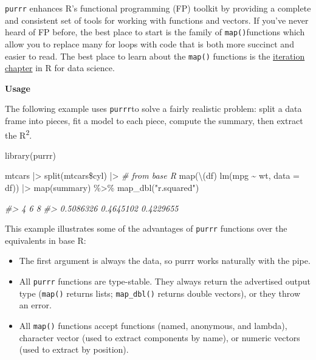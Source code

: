 \documentclass[
]{article}
\newenvironment{Shaded}{}{}
\newcommand{\AttributeTok}[1]{\textcolor[rgb]{0.49,0.56,0.16}{#1}}
\newcommand{\CommentTok}[1]{\textcolor[rgb]{0.38,0.63,0.69}{\textit{#1}}}
\newcommand{\FunctionTok}[1]{\textcolor[rgb]{0.02,0.16,0.49}{#1}}
\newcommand{\NormalTok}[1]{#1}
\newcommand{\SpecialCharTok}[1]{\textcolor[rgb]{0.25,0.44,0.63}{#1}}
\newcommand{\StringTok}[1]{\textcolor[rgb]{0.25,0.44,0.63}{#1}}
\begin{document}
\texttt{purrr} enhances R's functional programming (FP) toolkit by
providing a complete and consistent set of tools for working with
functions and vectors. If you've never heard of FP before, the best
place to start is the family of \texttt{map()}functions which allow you
to replace many for loops with code that is both more succinct and
easier to read. The best place to learn about the \texttt{map()}
functions is the \href{https://r4ds.had.co.nz/iteration.html}{iteration
chapter} in R for data science.

\textbf{Usage}

The following example uses \texttt{purrr}to solve a fairly realistic
problem: split a data frame into pieces, fit a model to each piece,
compute the summary, then extract the R\textsuperscript{2}.

\begin{Shaded}
\begin{Highlighting}[]
\FunctionTok{library}\NormalTok{(purrr)}

\NormalTok{mtcars }\SpecialCharTok{|\textgreater{}} 
  \FunctionTok{split}\NormalTok{(mtcars}\SpecialCharTok{\$}\NormalTok{cyl) }\SpecialCharTok{|\textgreater{}}  \CommentTok{\# from base R}
  \FunctionTok{map}\NormalTok{(\textbackslash{}(df) }\FunctionTok{lm}\NormalTok{(mpg }\SpecialCharTok{\textasciitilde{}}\NormalTok{ wt, }\AttributeTok{data =}\NormalTok{ df)) }\SpecialCharTok{|\textgreater{}} 
  \FunctionTok{map}\NormalTok{(summary) }\SpecialCharTok{\%\textgreater{}\%}
  \FunctionTok{map\_dbl}\NormalTok{(}\StringTok{"r.squared"}\NormalTok{)}
  
\CommentTok{\#\textgreater{}         4         6         8 }
\CommentTok{\#\textgreater{} 0.5086326 0.4645102 0.4229655}
\end{Highlighting}
\end{Shaded}

This example illustrates some of the advantages of \texttt{purrr}
functions over the equivalents in base R:

\begin{itemize}
\item
  The first argument is always the data, so purrr works naturally with
  the pipe.
\item
  All \texttt{purrr} functions are type-stable. They always return the
  advertised output type (\texttt{map()} returns lists;
  \texttt{map\_dbl()} returns double vectors), or they throw an error.
\item
  All \texttt{map()} functions accept functions (named, anonymous, and
  lambda), character vector (used to extract components by name), or
  numeric vectors (used to extract by position).
\end{itemize}
\end{document}
